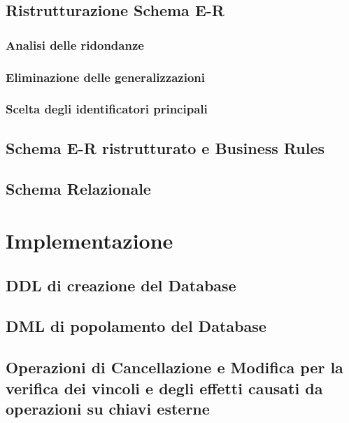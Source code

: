 \documentclass[12pt]{extarticle}
\begin{document}
\subsection{Ristrutturazione Schema E-R}
\subsubsection{Analisi delle ridondanze}
\subsubsection{Eliminazione delle generalizzazioni}
\subsubsection{Scelta degli identificatori principali}

\subsection{Schema E-R ristrutturato e Business Rules}

\subsection{Schema Relazionale}

\section{Implementazione}
\subsection{DDL di creazione del Database}

\subsection{DML di popolamento del Database}

\subsection{Operazioni di Cancellazione e Modifica per la verifica dei vincoli e degli effetti causati da operazioni su chiavi esterne}
\end{document}
